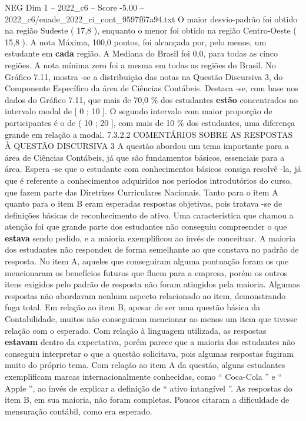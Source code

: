 \begin{textsample}{NEG Dim 1 – 2022\_c6 – Score -5.00 – 2022\_c6/enade\_2022\_ci\_cont\_9597f67a94.txt}
O maior desvio-padrão foi obtido na região Sudeste ( 17,8 ), enquanto o menor foi obtido na região Centro-Oeste ( 15,8 ).
A nota Máxima, 100,0 pontos, foi alcançada por, pelo menos, um estudante em \textbf{cada} região.
A Mediana do Brasil foi 0,0, para todas as cinco regiões.
A nota mínima zero foi a mesma em todas as regiões do Brasil.
No Gráfico 7.11, mostra -se a distribuição das notas na Questão Discursiva 3, do Componente Específico da área de Ciências Contábeis.
Destaca -se, com base nos dados do Gráfico 7.11, que mais de 70,0 \% dos estudantes \textbf{estão} concentrados no intervalo modal de [ 0 ; 10 ].
O segundo intervalo com maior proporção de participantes é o de ( 10 ; 20 ], com mais de 10 \% dos estudantes, uma diferença grande em relação a modal. 7.3.2.2 COMENTÁRIOS SOBRE AS RESPOSTAS À QUESTÃO DISCURSIVA 3 A questão abordou um tema importante para a área de Ciências Contábeis, já que são fundamentos básicos, essenciais para a área.
Espera -se que o estudante com conhecimentos básicos consiga resolvê -la, já que é referente a conhecimentos adquiridos nos períodos introdutórios do curso, que fazem parte das Diretrizes Curriculares Nacionais.
Tanto para o item A quanto para o item B eram esperadas respostas objetivas, pois tratava -se de definições básicas de reconhecimento de ativo.
Uma característica que chamou a atenção foi que grande parte dos estudantes não conseguiu compreender o que \textbf{estava} sendo pedido, e a maioria exemplificou ao invés de conceituar.
A maioria dos estudantes não respondeu de forma semelhante ao que constava no padrão de resposta.
No item A, aqueles que conseguiram alguma pontuação foram os que mencionaram os benefícios futuros que fluem para a empresa, porém os outros itens exigidos pelo padrão de resposta não foram atingidos pela maioria.
Algumas respostas não abordavam nenhum aspecto relacionado ao item, demonstrando fuga total.
Em relação ao item B, apesar de ser uma questão básica da Contabilidade, muitos não conseguiram mencionar ao menos um item que tivesse relação com o esperado.
Com relação à linguagem utilizada, as respostas \textbf{estavam} dentro da expectativa, porém parece que a maioria dos estudantes não conseguiu interpretar o que a questão solicitava, pois algumas respostas fugiram muito do próprio tema.
Com relação ao item A da questão, alguns estudantes exemplificam marcas internacionalmente conhecidas, como “ Coca-Cola ” e “ Apple ”, ao invés de explicar a definição de “ ativo intangível ”.
As respostas do item B, em sua maioria, não foram completas.
Poucos citaram a dificuldade de mensuração contábil, como era esperado.

\end{textsample}

